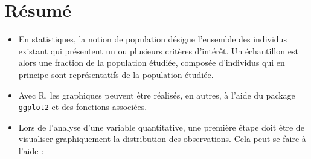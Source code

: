 \documentclass[
  french,
]{book}
\begin{document}
\hypertarget{ruxe9sumuxe9-2}{%
\section{Résumé}\label{ruxe9sumuxe9-2}}

\begin{itemize}
\item
  En statistiques, la notion de population désigne l'ensemble des individus existant qui présentent un ou plusieurs critères d'intérêt. Un échantillon est alors une fraction de la population étudiée, composée d'individus qui en principe sont représentatifs de la population étudiée.
\item
  Avec R, les graphiques peuvent être réalisés, en autres, à l'aide du package \texttt{ggplot2} et des fonctions associées.
\item
  Lors de l'analyse d'une variable quantitative, une première étape doit être de visualiser graphiquement la distribution des observations. Cela peut se faire à l'aide :


\end{itemize}
\end{document}
